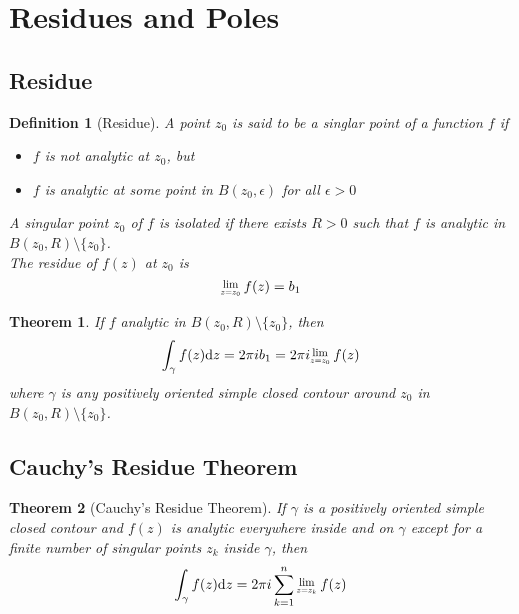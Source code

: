 \documentclass[12pt]{article}
\newcommand{\diff}{\mathrm{d}}
\newcommand{\Res}[1]{\raisebox{0.5ex}{\scalebox{0.8}{$\displaystyle \lim_{#1}\;$}}}
\newtheorem{definition}{Definition}[section]
\newtheorem{theorem}{Theorem}[section]
\theoremstyle{definition}
\begin{document}
\section{Residues and Poles}
\subsection{Residue}
\begin{definition}[Residue]
\normalfont A point $z_0$ is said to be a singlar point of a function $f$ if
\begin{itemize}
	\item $f$ is not analytic at $z_0$, but
	\item $f$ is analytic at some point in $B(z_0, \epsilon)$ for all $\epsilon>0$
\end{itemize}
A singular point $z_0$ of $f$ is isolated if there exists $R>0$ such that $f$ is analytic in $B(z_0, R)\setminus \{z_0\}$.\\
The residue of $f(z)$ at $z_0$ is
\[
\Res{z=z_0}f(z)=b_1
\]
\end{definition}
\begin{theorem}\normalfont If $f$ analytic in $B(z_0, R)\setminus \{z_0\}$, then
\[
\int_\gamma f(z)\diff z = 2\pi i b_1 = 2\pi i\Res{z=z_0}f(z)
\]
where $\gamma$ is any positively oriented simple closed contour around $z_0$ in $B(z_0, R)\setminus \{z_0\}$.
\end{theorem}
\subsection{Cauchy's Residue Theorem}
\begin{theorem}[Cauchy's Residue Theorem]
\normalfont If $\gamma$ is a positively oriented simple closed contour and $f(z)$ is analytic everywhere inside and on $\gamma$ except for a finite number of singular points $z_k$ inside $\gamma$, then
\[
\int_\gamma f(z)\diff z = 2\pi i \sum_{k=1}^n \Res{z=z_k} f(z)
\]
\end{theorem}
\end{document}
